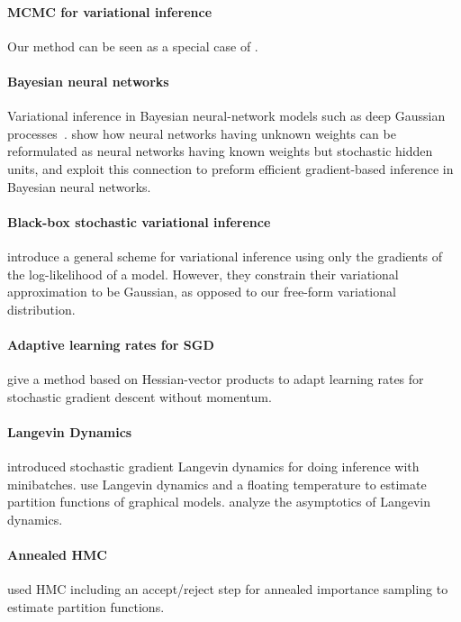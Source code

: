 \documentclass[]{article}
\begin{document}
\paragraph{MCMC for variational inference}
Our method can be seen as a special case of \citet{Bridging14}.


\paragraph{Bayesian neural networks}
Variational inference in Bayesian neural-network models such as deep Gaussian processes~\citep{deepGPVar14}.
\citet{kingma2014efficient} show how neural networks having unknown weights can be reformulated as neural networks having known weights but stochastic hidden units, and exploit this connection to preform efficient gradient-based inference in Bayesian neural networks.


\paragraph{Black-box stochastic variational inference}
\citet{alp2014blackbox} introduce a general scheme for variational inference using only the gradients of the log-likelihood of a model.
However, they constrain their variational approximation to be Gaussian, as opposed to our free-form variational distribution.

\paragraph{Adaptive learning rates for SGD}
\citet{courbariaux2014low} give a method based on Hessian-vector products to adapt learning rates for stochastic gradient descent without momentum.


\paragraph{Langevin Dynamics}
\citet{welling2011bayesian} introduced stochastic gradient Langevin dynamics for doing inference with minibatches.
\citet{ma2013estimating} use Langevin dynamics and a floating temperature to estimate partition functions of graphical models.
\citet{vollmer2015non} analyze the asymptotics of Langevin dynamics.

\paragraph{Annealed HMC}
\citet{sohl2012hamiltonian} used HMC including an accept/reject step for annealed importance sampling to estimate partition functions.
\end{document}
